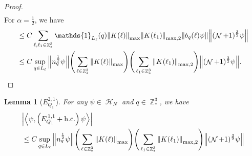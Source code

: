 \documentclass[sn-mathphys, Numbered ,a4paper]{sn-jnl}%
\DeclareMathOperator{\Z}{\mathbb{Z}}
\DeclareMathOperator{\HH}{\mathcal{H}}
\DeclareMathOperator{\NN}{\mathcal{N}}
\newcommand{\half}{\frac{1}{2}}
\newcommand{\eva}[1]{\left\langle #1 \right\rangle}
\theoremstyle{plain}
\newtheorem{lemma}[theorem]{Lemma}
\theoremstyle{definition}
\theoremstyle{remark}
\theoremstyle{plain}
\theoremstyle{definition}
\theoremstyle{remark}
\begin{document}
\begin{proof}
\begin{align}
    \end{align}
    For $\alpha = \half$, we have
    \begin{align}
    &\leq C\sum\limits_{\ell,\ell_1 \in \Z^3_*} \mathds{1}_{L_\ell}(q) \norm{K(\ell)}_{\mathrm{max}}\norm{K(\ell_1)}_{\mathrm{max},2}  \norm{b_{q}(\ell) \psi} \norm { (\NN+1)^{\frac{3}{2}} \psi }\nonumber\\
    &\leq C \sup\limits_{q \in L_\ell} \norm{n_{q}^{\half} \psi} \Bigg(\sum\limits_{\ell \in \Z^3_*} \norm{K(\ell)}_{\mathrm{max}}\Bigg)\Bigg( \sum\limits_{\ell_1 \in \Z^3_*}\norm{K(\ell_1)}_{\mathrm{max},2} \Bigg)  \norm { (\NN+1)^{\frac{3}{2}} \psi }. \label{eq:preleadbosest}
    \end{align}
\end{proof}
\begin{lemma}[$E_{Q_1}^{2,1}$]
For any $\psi \in \HH_N$ and $q \in \Z^3_*$, we have
\begin{align}
	&\abs{\eva{\psi,\left( E^{\,1,1}_{Q_1}+\mathrm{h.c.} \right) \psi }}\nonumber\\
	&\leq  C \sup\limits_{q \in L_\ell} \norm{n_{q}^{\half} \psi} \Bigg(\sum\limits_{\ell \in \Z^3_*} \norm{K(\ell)}_{\mathrm{max}}\Bigg)\Bigg( \sum\limits_{\ell_1 \in \Z^3_*}\norm{K(\ell_1)}_{\mathrm{max},2} \Bigg)  \norm { (\NN+1)^{\frac{3}{2}} \psi } \label{eq:estEQ121}
	\end{align}
\end{lemma}
\end{document}
